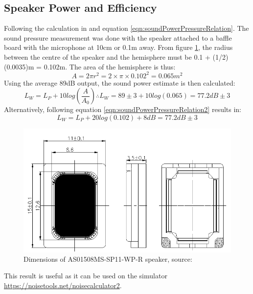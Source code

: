 \documentclass[12pt, a4paper]{article}
\begin{document}
	\subsection{Speaker Power and Efficiency} 
	Following the calculation in \cite{soundPowerCalculator} and equation \ref{eqn:soundPowerPressureRelation}. The sound pressure measurement was done with the speaker attached to a baffle board with the microphone at 10cm or 0.1m away. From figure \ref{fig:speakerDims}, the radius between the centre of the speaker and the hemisphere must be 0.1 + (1/2)(0.0035)m = 0.102m. The area of the hemisphere is thus:
	\begin{equation*}
		A = 2 \pi r^2 = 2\times\pi\times0.102^2 = 0.065m^2
	\end{equation*}
	Using the average 89dB output, the sound power estimate is then calculated:
	\begin{equation}
		L_W = L_P + 10log\left(\frac{A}{A_0}\right) \therefore L_W = 89\pm3 + 10log\left(0.065\right) = 77.2dB \pm 3
		\label{eqn:ourSpeakerPower}
	\end{equation}
	Alternatively, following equation \ref{eqn:soundPowerPressureRelation2} results in:
	\begin{equation*}
		L_W = L_P + 20log(0.102) + 8 dB = 77.2dB\pm3
	\end{equation*}
	\begin{figure}[!htb]
		\includegraphics[width=\textwidth]{./Figures/speaker_dimensions}
		\caption{Dimensions of AS01508MS-SP11-WP-R speaker, source:\cite{speakerDatasheet}}
		\label{fig:speakerDims}
	\end{figure}

	This result is useful as it can be used on the simulator \url{https://noisetools.net/noisecalculator2}.\\
	
\end{document}
